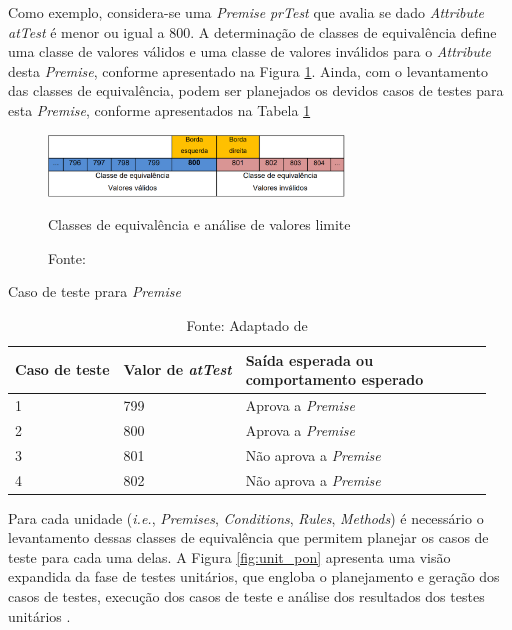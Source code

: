 Como exemplo, considera-se uma \textit{Premise} \textit{prTest} que avalia se
dado \textit{Attribute} \textit{atTest} é menor ou igual a 800. A determinação
de classes de equivalência define uma classe de valores válidos e uma classe de
valores inválidos para o \textit{Attribute} desta \textit{Premise}, conforme
apresentado na Figura \ref{fig:classe_equivalencia}. Ainda, com o levantamento
das classes de equivalência, podem ser planejados os devidos casos de testes
para esta \textit{Premise}, conforme apresentados na Tabela \ref{tab:test_case}

\begin{figure}[!htb]
  \centering
  \includegraphics[width=0.7\textwidth]{../figures/classes_equivalencia.png}
  \smallskip
  \caption{Classes de equivalência e análise de valores limite}
  \caption*{Fonte: }
  \label{fig:classe_equivalencia}
\end{figure}


\begin{table}[!htb]
  \centering
  \caption{Caso de teste prara \textit{Premise}} \caption*{Fonte: Adaptado de
    }
  \label{tab:test_case}
  \smallskip
  \begin{tabularx}{\textwidth}{|l|*{6}{X|}}\hline
    Caso de teste & Valor de \textit{atTest} & \makecell{Saída esperada ou\\ comportamento esperado}    \\\hline
    1 & 799 & Aprova a \textit{Premise} \\ \hline
    2 & 800 & Aprova a \textit{Premise} \\ \hline
    3 & 801 & Não aprova a \textit{Premise} \\ \hline
    4 & 802 & Não aprova a \textit{Premise} \\ \hline
  \end{tabularx}
\end{table}

\FloatBarrier

Para cada unidade (\textit{i.e.}, \textit{Premises}, \textit{Conditions},
\textit{Rules}, \textit{Methods}) é necessário o levantamento dessas classes de
equivalência que permitem planejar os casos de teste para cada uma delas. A
Figura \ref{fig:unit_pon} apresenta uma visão expandida da fase de testes
unitários, que engloba o planejamento e geração dos casos de testes, execução
dos casos de teste e análise dos resultados dos testes unitários
\cite{msc_Kossoski_2015}.

